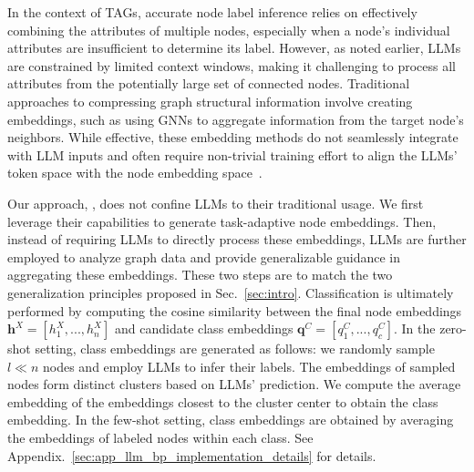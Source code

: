 In the context of TAGs, accurate node label inference relies on effectively combining the attributes of multiple nodes, especially when a node's individual attributes are insufficient to determine its label. However, as noted earlier, LLMs are constrained by limited context windows, making it challenging to process all attributes from the potentially large set of connected nodes. Traditional approaches to compressing graph structural information involve creating embeddings, such as using GNNs to aggregate information from the target node's neighbors. While effective, these embedding methods do not seamlessly integrate with LLM inputs and often require non-trivial training effort to align the LLMs' token space with the node embedding space~\cite{chen2024llaga, wang2024llms, tang2024graphgpt}. 

Our approach, \proj, does not confine LLMs to their traditional usage. We first leverage their capabilities to generate task-adaptive node embeddings. Then, instead of requiring LLMs to directly process these embeddings, LLMs are further employed to analyze graph data and provide generalizable guidance in aggregating these embeddings. These two steps are to match the two generalization principles proposed in Sec.~\ref{sec:intro}. Classification is ultimately performed by computing the cosine similarity between the final node embeddings $\mathbf{h}^X=[h_1^X,...,h_n^X]$ and candidate class embeddings $\mathbf{q}^C=[q_1^C,...,q_c^C]$. In the zero-shot setting, class embeddings are generated as follows: we randomly sample $l \ll n$ nodes and employ LLMs to infer their labels. The embeddings of sampled nodes form distinct clusters based on LLMs' prediction. We compute the average embedding of the embeddings closest to the cluster center to obtain the class embedding. 
In the few-shot setting, class embeddings are obtained by averaging the embeddings of labeled nodes within each class. See Appendix.~\ref{sec:app_llm_bp_implementation_details} for details.












